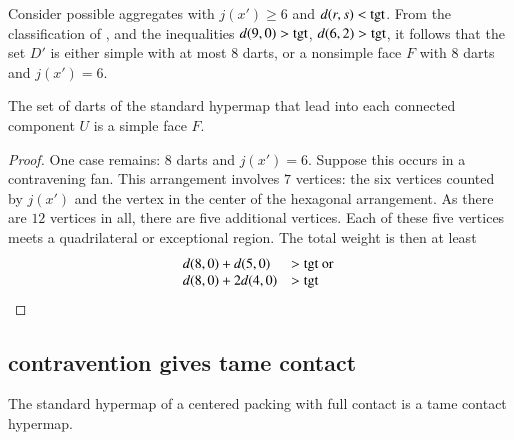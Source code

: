 Consider possible aggregates with $j(x')\ge 6$ and $d(r,s)<{\operatorname{tgt}}$.
From the classification of \cite[p.~126,~Fig.~12.1]{Hales:2006:DCG}, and the inequalities $d(9,0) > {\operatorname{tgt}}$, $d(6,2) > {\operatorname{tgt}}$, it follows that the set $D'$
is either simple with at most $8$ darts, or a nonsimple face $F$ with $8$ darts and $j(x')=6$.

\begin{lemma}\label{lemma:simple} The set of darts of the standard hypermap that lead into each connected component $U$ is a simple face $F$.
\end{lemma}

\begin{proof} One  case remains: $8$ darts and $j(x')=6$.  Suppose this occurs in a contravening fan.  This arrangement involves $7$ vertices: the six vertices counted by $j(x')$ and the vertex in the center of the hexagonal arrangement.  As there are $12$ vertices in all, there are five additional vertices.  Each of these five vertices meets a quadrilateral or exceptional region.  The total weight is then at least
$$
\begin{array}{lll}
d(8,0) + d(5,0) &> {\operatorname{tgt}}\hbox{ or }\\
d(8,0) + 2 d(4,0) &> {\operatorname{tgt}}\\
\end{array}
$$
\end{proof}








\subsection{contravention gives tame contact}

\begin{theorem} The standard hypermap of a centered packing with full contact is a tame contact hypermap.
\end{theorem}

